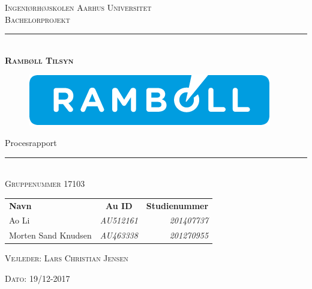 \thispagestyle{empty}
\newcommand{\HRule}{\rule{\linewidth}{0.1mm}} %

\begin{center}
	\vspace{3cm}
	\textsc{\LARGE Ingeniørhøjskolen Aarhus Universitet}\\[1.5cm] %
	
	\textsc{\large Bachelorprojekt}\\[2.5cm] 
	
	\HRule \\[0.8cm]
	{\huge \bfseries \textsc{Rambøll Tilsyn}} 
	\begin{figure}[h!]
		\centering
		\includegraphics[width=0.7\linewidth]{Forside/Logo}
	\end{figure}

	{\LARGE Procesrapport} \\[0.4cm]
	\HRule \\[1.5cm]
	

	
	\textsc{\large Gruppenummer 17103}\\
	\vspace{0.5 in}
	\begin{center}
		\begin{tabular}{l c r}
			\textbf{Navn} & \textbf{Au ID} & \textbf{Studienummer} \\
			Ao Li & \textsl{AU512161} & \textsl{201407737}    \\
			Morten Sand Knudsen & \textsl{AU463338} & \textsl{201270955}  \\
		\end{tabular}
	\end{center}
	\vspace{0.5 in}
	
	\textsc{\large Vejleder: Lars Christian Jensen}
	\vspace{0.5 in}
	
	\textsc{\large Dato: 19/12-2017}\\
	\vfill %
	
\end{center} %

\clearpage

\newpage